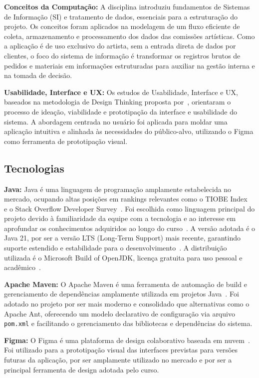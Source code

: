 \textbf{Conceitos da Computação:}
A disciplina introduziu fundamentos de Sistemas de Informação (SI) e 
tratamento de dados, essenciais para a estruturação do projeto. Os 
conceitos foram aplicados na modelagem de um fluxo eficiente de coleta, 
armazenamento e processamento dos dados das comissões artísticas. Como 
a aplicação é de uso exclusivo do artista, sem a entrada direta de dados
por clientes, o foco do sistema de informação é transformar os registros
brutos de pedidos e materiais em informações estruturadas para auxiliar 
na gestão interna e na tomada de decisão.

\textbf{Usabilidade, Interface e UX:}
Os estudos de Usabilidade, Interface e UX, baseados na metodologia de 
Design Thinking proposta por~\cite{brown2010}, orientaram o processo de 
ideação, viabilidade e prototipação da interface e usabilidade do sistema. 
A abordagem centrada no usuário foi aplicada para moldar uma aplicação 
intuitiva e alinhada às necessidades do público-alvo, utilizando o Figma 
como ferramenta de prototipação visual.

\subsection{Tecnologias}

\textbf{Java:}
Java é uma linguagem de programação amplamente estabelecida no mercado, 
ocupando altas posições em rankings relevantes como o TIOBE Index~\cite{tiobe} 
e o Stack Overflow Developer Survey~\cite{stackoverflow_survey}. 
Foi escolhida como linguagem principal do projeto devido à familiaridade 
da equipe com a tecnologia e ao interesse em aprofundar os conhecimentos 
adquiridos ao longo do curso~\cite{java}. A versão adotada é o Java 21, 
por ser a versão LTS (Long-Term Support) mais recente, garantindo suporte 
estendido e estabilidade para o desenvolvimento~\cite{java21}. A distribuição 
utilizada é o Microsoft Build of OpenJDK, licença gratuita para uso pessoal 
e acadêmico~\cite{msjdk}.

\textbf{Apache Maven:}
O Apache Maven é uma ferramenta de automação de build e gerenciamento de 
dependências amplamente utilizada em projetos Java~\cite{maven}. Foi adotado 
no projeto por ser mais moderno e consolidado que alternativas como o Apache 
Ant, oferecendo um modelo declarativo de configuração via arquivo 
\texttt{pom.xml} e facilitando o gerenciamento das bibliotecas e dependências 
do sistema.

\textbf{Figma:}
O Figma é uma plataforma de design colaborativo baseada em nuvem~\cite{figma}.
Foi utilizado para a prototipação visual das interfaces previstas para versões 
futuras da aplicação, por ser amplamente utilizado no mercado e por ser a 
principal ferramenta de design adotada pelo curso.

